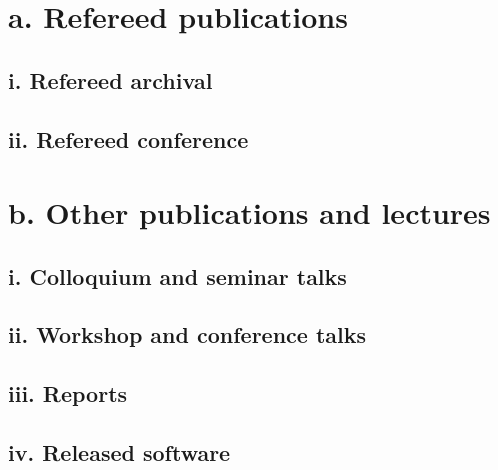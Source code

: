 \documentclass{article}
\begin{document}


\section*{a. Refereed publications}

\subsection*{i. Refereed archival}



\subsection*{ii. Refereed conference}




\section*{b. Other publications and lectures}

\subsection*{i. Colloquium and seminar talks}



\subsection*{ii. Workshop and conference talks}



\subsection*{iii. Reports}



\subsection*{iv. Released software}
\end{document}
